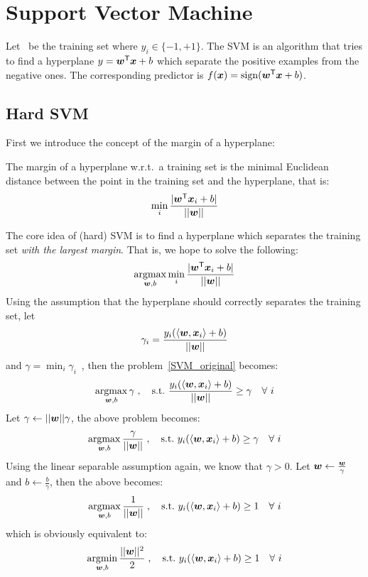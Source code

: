 \section{Support Vector Machine}
Let \dataset\ be the training set where $y_i \in\{-1, +1\}$. The SVM is an algorithm that tries to find a 
hyperplane $y = {\boldsymbol{w}}^\mathsf{T}\boldsymbol{x} + b$ which separate the positive examples from the negative ones. The 
corresponding predictor is $f(\boldsymbol{x}) = \operatorname{sign}({\boldsymbol{w}}^\mathsf{T}\boldsymbol{x} + b)$.

\subsection{Hard SVM}
First we introduce the concept of the margin of a hyperplane:
\begin{df}[Margin]
    The margin of a hyperplane w.r.t.\ a training set is the minimal Euclidean distance between the point in the 
    training set and the hyperplane, that is:
    \begin{equation*}
    \min_i \frac{|{\boldsymbol{w}}^\mathsf{T}\boldsymbol{x}_i + b|}{||\boldsymbol{w}||}
    \end{equation*}
\end{df}

The core idea of (hard) SVM is to find a hyperplane which separates the training set
\textit{with the largest margin}. That is, we hope to solve the following:
\begin{equation}\label{SVM_original}
    \operatorname*{argmax}_{\boldsymbol{w}, b}\min_i \frac{|{\boldsymbol{w}}^\mathsf{T}\boldsymbol{x}_i + b|}{||\boldsymbol{w}||}
\end{equation}
Using the assumption that the hyperplane should correctly separates the training set, let
$$\gamma_i = \frac{y_i(\langle\boldsymbol{w}, \boldsymbol{x}_i\rangle + b)}{||\boldsymbol{w}||}$$
and $\gamma =\displaystyle \min_i \gamma_i$~, then the problem~\eqref{SVM_original} becomes:
\begin{equation}
    \operatorname*{argmax}_{\boldsymbol{w}, b} \gamma\;,\quad \text{s.t.\ } \frac{y_i(\langle\boldsymbol{w}, \boldsymbol{x}_i\rangle + b)}{||\boldsymbol{w}||} \geq \gamma
    \quad\forall\ i
\end{equation}
Let $\gamma \gets ||\boldsymbol{w}||\gamma$, the above problem becomes:
\begin{equation}
    \operatorname*{argmax}_{\boldsymbol{w}, b} \frac{\gamma}{||\boldsymbol{w}||}\;,\quad \text{s.t.\ } y_i(\langle\boldsymbol{w}, \boldsymbol{x}_i\rangle + b) \geq \gamma
    \quad\forall\ i
\end{equation}
Using the linear separable assumption again, we know that $\gamma > 0$. Let $\boldsymbol{w} \gets \frac{\boldsymbol{w}}{\gamma}$
and $b \gets \frac{b}{\gamma}$, then the above becomes:
\begin{equation}\label{SVM_argmax}
    \operatorname*{argmax}_{\boldsymbol{w}, b} \frac{1}{||\boldsymbol{w}||}\;,\quad \text{s.t.\ } y_i(\langle\boldsymbol{w}, \boldsymbol{x}_i\rangle + b) \geq 1
    \quad\forall\ i
\end{equation}
which is obviously equivalent to:
\begin{equation}\label{hard_SVM}
    \operatorname*{argmin}_{\boldsymbol{w}, b} \frac{||\boldsymbol{w}||^2}{2}\;,\quad \text{s.t.\ } y_i(\langle\boldsymbol{w}, \boldsymbol{x}_i\rangle + b) \geq 1
    \quad\forall\ i
\end{equation}

